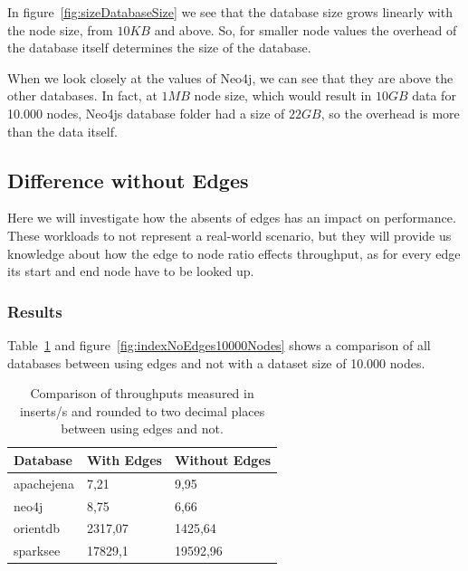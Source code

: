 In figure~\ref{fig:sizeDatabaseSize} we see that the database size grows linearly with the node size,
from $ 10KB $ and above.
So,
for smaller node values the overhead of the database itself determines the size of the database.

When we look closely at the values of Neo4j,
we can see that they are above the other databases.
In fact,
at $ 1MB $ node size,
which would result in $ 10GB $ data for 10.000 nodes,
Neo4js database folder had a size of $ 22GB $,
so the overhead is more than the data itself.

\subsection{Difference without Edges}
\label{ch:evaluation:se:differenceEdges}
Here we will investigate how the absents of edges has an impact on performance.
These workloads to not represent a real-world scenario,
but they will provide us knowledge about how the edge to node ratio effects throughput,
as for every edge its start and end node have to be looked up.

\subsubsection{Results}
Table~\ref{tab:indexNoEdges10000Nodes} and figure~\ref{fig:indexNoEdges10000Nodes} shows a comparison of all databases between using edges and not with a dataset size of 10.000 nodes.

\begin{table}[h!]
  \begin{minipage}{\textwidth}
    \centering
    \begin{tabularx}{\textwidth}{ | X | X | X | }
      \hline
      Database & With Edges & Without Edges \\ \hline
      apachejena & 7,21 & 9,95 \\ \hline
      neo4j & 8,75 & 6,66 \\ \hline
      orientdb & 2317,07 & 1425,64 \\ \hline
      sparksee & 17829,1 & 19592,96 \\ \hline
    \end{tabularx}
  \end{minipage}
  \caption{Comparison of throughputs measured in inserts/s and rounded to two decimal places between using edges and not.}
  \label{tab:indexNoEdges10000Nodes}
\end{table}

